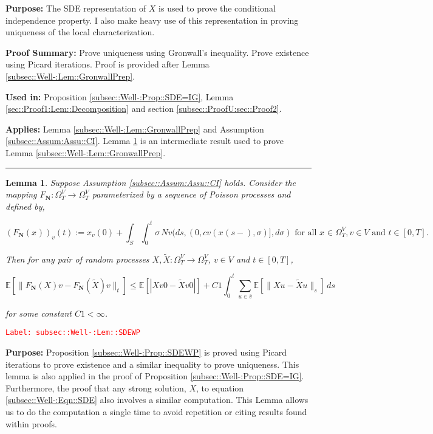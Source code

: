 \documentclass[12pt]{article}
\newcommand{\mb}{\mathbb}
\newcommand{\ra}{\rightarrow}
\newcommand{\ov}{\overline}
\newcommand{\te}{\text}
\newcommand{\tr}{\textcolor{red}}
\newcommand{\labe}[1]{\tr{\texttt{Label: #1}}}
\newcommand{\purpose}{\textbf{Purpose: }}
\newcommand{\pfsum}{\textbf{Proof Summary: }}
\newcommand{\usein}{\textbf{Used in: }}
\newcommand{\app}{\textbf{Applies: }}
\newcommand{\lin}{\rule{\linewidth}{0.4 pt}}
\newcommand{\ex}[1]{\mb{E}\left[#1\right]}			%
\renewcommand{\v}{v}							%
\newcommand{\vv}{u}								%
\renewcommand{\S}{S}							%
\newcommand{\s}{\sigma}							%
\newcommand{\T}{T}								%
\newcommand{\x}{x}								%
\renewcommand{\t}{t}							%
\newcommand{\sset}{\Omega}						%
\renewcommand{\tt}{s}							%
\newcommand{\X}{X}								%
\newcommand{\IGr}{c}							%
\newcommand{\vsi}[1]{^{#1}}						%
\newcommand{\cind}[1]{_{#1}}					%
\newcommand{\cl}{\ov}							%
\newcommand{\tp}[1]{(#1)}						%
\newcommand{\tip}[1]{#1}						%
\newcommand{\ts}[1]{_{#1}}						%
\newcommand{\const}{C}							%
\newcommand{\poisses}{\mathbf{N}}				%
\newcommand{\poiss}{N}							%
\newcommand{\Fpo}{F_{\poisses}}					%
\newcommand{\alt}[1]{\widetilde{#1}}			%
\newtheorem{lem}[thms]{Lemma}
\begin{document}
\purpose The SDE representation of \(\X{}{}\) is used to prove the conditional independence property. I also make heavy use of this representation in proving uniqueness of the local characterization.

\pfsum Prove uniqueness using Gronwall's inequality. Prove existence using Picard iterations. Proof is provided after Lemma \ref{subsec::Well-:Lem::GronwallPrep}.

\usein Proposition \ref{subsec::Well-:Prop::SDE=IG}, Lemma \ref{sec::Proof1:Lem::Decomposition} and section \ref{subsec::ProofU:sec::Proof2}.

\app Lemma \ref{subsec::Well-:Lem::GronwallPrep} and Assumption \ref{subsec::Assum:Assu::CI}. Lemma \ref{subsec::Well-:Lem::SDEWP} is an intermediate result used to prove Lemma \ref{subsec::Well-:Lem::GronwallPrep}.

\lin

\begin{lem}
Suppose Assumption \ref{subsec::Assum:Assu::CI} holds. Consider the mapping \(\Fpo: \sset\vsi{V}\ts{\T} \ra \sset\vsi{V}\ts{\T}\) parameterized by a sequence of Poisson processes and defined by,

\[\left(\Fpo(\x\cind{}\tip{})\right)\cind{\v}\tp{\t} := \x\cind{\v}\tp{0} + \int_\S\int_0^\t \s \,\poiss{\v}(d\tt,(0,\IGr{\v}(\x\cind{}\tp{\tt-},\s)],d\s) \te{ for all }\x\cind{}\tip{} \in \sset\vsi{V}\ts{\T}, \v \in V\te{ and }\t \in [0,\T].\]

Then for any pair of random processes \(\X{}{},\alt{\X}{}{}:\sset\vsi{V}\ts{\T} \ra \sset\vsi{V}\ts{\T}\), \(\v\in V\) and \(\t \in [0,\T]\),

\[\ex{\|\Fpo(\X{}{}){\v} - \Fpo(\alt{\X}{}{}){\v}\|_\t} \leq \ex{|\X{\v}{0} - \alt{\X}{\v}{0}|} +  \const{1}\int_0^\t \sum_{\vv\in \cl{\v}} \ex{\|\X{\vv}{} - \alt{\X}{\vv}{}\|_\tt}\,d\tt\]

for some constant \(\const{1} < \infty\).

\label{subsec::Well-:Lem::SDEWP}
\end{lem}
\labe{subsec::Well-:Lem::SDEWP}

\purpose Proposition \ref{subsec::Well-:Prop::SDEWP} is proved using Picard iterations to prove existence and a similar inequality to prove uniqueness. This lemma is also applied in the proof of Proposition \ref{subsec::Well-:Prop::SDE=IG}. Furthermore, the proof that any strong solution, \(\X{}{}\), to equation \eqref{subsec::Well-:Eqn::SDE} also involves a similar computation. This Lemma allows us to do the computation a single time to avoid repetition or citing results found within proofs.
\end{document}
